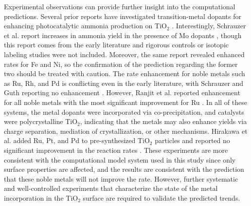 Experimental observations can provide further insight into the computational predictions. Several prior reports have investigated transition-metal dopants for enhancing photocatalytic ammonia production on TiO$_2$ \cite{Schrauzer_1977, Ranjit_1996, Hirakawa_2017}. Interestingly, Schrauzer et al. report increases in ammonia yield in the presence of Mo dopants \cite{Schrauzer_1977}, though this report comes from the early literature and rigorous controls \cite{Greenlee_2018} or isotopic labeling studies \cite{Andersen_2019} were not included. Moreover, the same report revealed enhanced rates for Fe and Ni, so the confirmation of the prediction regarding the former two should be treated with caution. The rate enhancement for noble metals such as Ru, Rh, and Pd is conflicting even in the early literature, with Schrauzer and Guth reporting no enhancement \cite{Schrauzer_1977}. However, Ranjit et al. reported enhancement for all noble metals with the most significant improvement for Ru \cite{Ranjit_1996}. In all of these systems, the metal dopants were incorporated via co-precipitation, and catalysts were polycrystalline TiO$_2$, indicating that the metals may also enhance yields via charge separation, mediation of crystallization, or other mechanisms\cite{Medford_2017}. Hirakawa et al. added Ru, Pt, and Pd to pre-synthesized TiO$_2$ particles and reported no significant improvement in the reaction rates \cite{Hirakawa_2017}. These experiments are more consistent with the computational model system used in this study since only surface properties are affected, and the results are consistent with the prediction that these noble metals will not improve the rate. However, further systematic and well-controlled experiments that characterize the state of the metal incorporation in the TiO$_2$ surface are required to validate the predicted trends.








